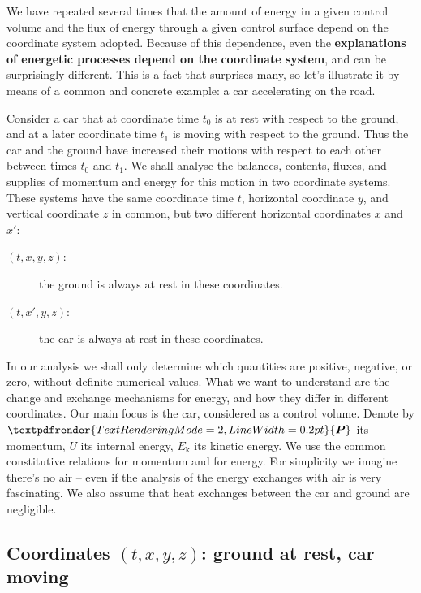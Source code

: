 \documentclass[a4paper,12pt,%
onecolumn,oneside,%
british%
]{memoir}
\renewcommand*{\bm}[1]{\textpdfrender{TextRenderingMode=2,LineWidth=0.2pt}{\boldsymbol{#1}}}
\renewcommand*{\|}[1][]{\nonscript\:#1\vert\nonscript\:\mathopen{}}
\newcommand*{\sect}{\S}%
\renewcommand*{\autoref}[3][\sect\,\ref]{\textcolor{blue}{#3} {\color{blue}\scriptsize(\faIcon[regular]{eye}\;#1{#2}\;p.\,\pageref{#2})}}
\newcommand*{\yti}{t_{0}}
\newcommand*{\ytf}{t_{1}}
\newcommand*{\yE}{E}
\newcommand*{\yU}{U}
\newcommand*{\yEk}{\yE_{\textrm{k}}}%
\newcommand*{\yP}{\bm{P}}
\begin{document}
We have repeated several times that the amount of energy in a given control volume and the flux of energy through a given control surface depend on the coordinate system adopted. Because of this dependence, even the \textbf{explanations of energetic processes depend on the coordinate system}, and can be surprisingly different. This is a fact that surprises many, so let's illustrate it by means of a common and concrete example: a car accelerating on the road.

Consider a car that at coordinate time $\yti$ is at rest with respect to the ground, and at a later coordinate time $\ytf$ is moving with respect to the ground. Thus the car and the ground have increased their motions with respect to each other between times $\yti$ and $\ytf$. We shall analyse the balances, contents, fluxes, and supplies of momentum and energy for this motion in two coordinate systems. These systems have the same coordinate time $t$, horizontal coordinate $y$, and vertical coordinate $z$ in common, but two different horizontal coordinates $x$ and $x'$:
\begin{description}
\item[$(t,x,y,z)$:] the ground is always at rest in these coordinates.
\item[$(t,x',y,z)$:] the car is always at rest in these coordinates.
\end{description}

In our analysis we shall only determine which quantities are positive, negative, or zero, without definite numerical values. What we want to understand are the change and exchange mechanisms for energy, and how they differ in different coordinates. Our main focus is the car, considered as a control volume. Denote by $\yP$ its momentum, $\yU$ its internal energy, $\yEk$ its kinetic energy. We use the common constitutive relations for momentum and for energy. For simplicity we imagine there's no air -- even if the analysis of the energy exchanges with air is very fascinating. We also assume that heat exchanges between the car and ground are negligible. %

\subsection{Coordinates $(t,x,y,z)$: ground at rest, car moving}
\label{sec:car_road_1}
\end{document}
